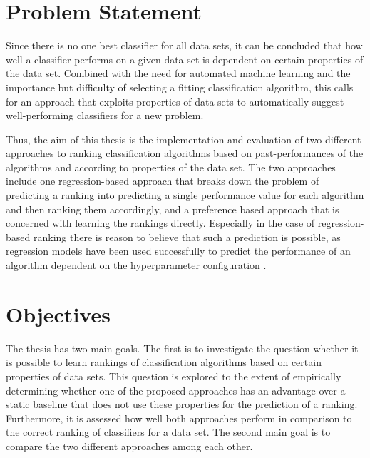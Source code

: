 \section{Problem Statement}
\label{sec:intro:problem}
Since there is no one best classifier for all data sets, it can be concluded that how well a classifier performs on a given data set is dependent on certain properties of the data set. Combined with the need for automated machine learning and the importance but difficulty of selecting a fitting classification algorithm, this calls for an approach that exploits properties of data sets to automatically suggest well-performing classifiers for a new problem.

Thus, the aim of this thesis is the implementation and evaluation of two different approaches to ranking classification algorithms based on past-performances of the algorithms and according to properties of the data set. The two approaches include one regression-based approach that breaks down the problem of predicting a ranking into predicting a single performance value for each algorithm and then ranking them accordingly, and a preference based approach that is concerned with learning the rankings directly. Especially in the case of regression-based ranking there is reason to believe that such a prediction is possible, as regression models have been used successfully to predict the performance of an algorithm dependent on the hyperparameter configuration \cite{DBLP:conf/aaai/EggenspergerHHL15}.

\section{Objectives}
\label{sec:intro:objectives}

The thesis has two main goals. The first is to investigate the question whether it is possible to learn rankings of classification algorithms based on certain properties of data sets. This question is explored to the extent of empirically determining whether one of the proposed approaches has an advantage over a static baseline that does not use these properties for the prediction of a ranking. Furthermore, it is assessed how well both approaches perform in comparison to the correct ranking of classifiers for a data set. The second main goal is to compare the two different approaches among each other.

